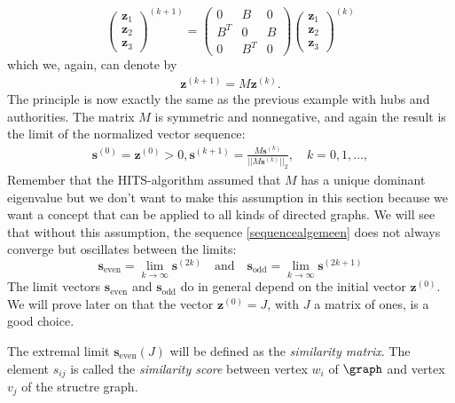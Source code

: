\documentclass[a4paper,11pt]{report}
\begin{document}
$$\begin{pmatrix}
\mathbf{z}_1\\
\mathbf{z}_2\\
\mathbf{z}_3
\end{pmatrix}^{(k+1)} = \begin{pmatrix}
0 & B & 0\\
B^T & 0 & B\\
0 & B^T & 0
\end{pmatrix}\begin{pmatrix}
\mathbf{z}_1\\
\mathbf{z}_2\\
\mathbf{z}_3
\end{pmatrix}^{(k)}   $$ 
which we, again, can denote by 
\begin{eqnarray}\label{kleinecompact}
 \mathbf{z}^{(k+1)} = M\mathbf{z}^{(k)}.
  \end{eqnarray}
 The principle is now exactly the 
same as the previous example with hubs and authorities. The matrix $M$ is 
symmetric and nonnegative, and again the result is the limit of the normalized vector sequence:
\begin{eqnarray}\label{sequencealgemeen}
  \mathbf{s}^{(0)} = \mathbf{z}^{(0)} > 0, \mathbf{s}^{(k+1)} = \frac{M\mathbf{s}^{(k)}}{||M\mathbf{s}^{(k)}||_2}, \quad k = 
  0,1,\ldots,
\end{eqnarray}
Remember that the HITS-algorithm assumed that $M$ has a unique dominant 
eigenvalue but we don't want to make this assumption in this section because we 
want a concept that can be applied to all kinds of directed graphs. We will see 
that without this assumption, the sequence \ref{sequencealgemeen} does not 
always converge but oscillates between the limits:
$$\mathbf{s}_\text{even}= \lim_{k\to\infty}\mathbf{s}^{(2k)}\quad\text{and}\quad \mathbf{s}_{\text{odd}}= \lim_{k\to\infty}\mathbf{s}^{(2k+1)}$$ 
The limit vectors $\mathbf{s}_\text{even}$ and $\mathbf{s}_\text{odd}$ do in 
general depend on the initial vector $\mathbf{z}^{(0)}$. We will prove later on that the vector 
$\mathbf{z}^{(0)}=J$, with $J$ a matrix of ones,
is a good choice.

The  
extremal limit  $\mathbf{s}_{\text{even}}(J)$ will be defined as the \textit{similarity 
matrix}. The element $s_{ij}$ is called the \textit{similarity score}
between vertex $w_i$ of $\graph$ and vertex $v_j$ of the structre graph. 
\end{document}
